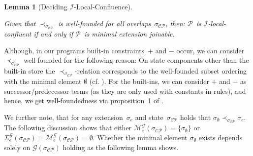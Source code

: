 \documentclass{tlp}
\newtheorem{lemma}[theorem]{Lemma}
\newcommand{\mcCP}{\ensuremath{\mathcal{CP}}}
\newcommand{\mcI}{\ensuremath{\mathcal{I}}}
\newcommand{\mcG}{\ensuremath{\mathcal{G}}}
\newcommand{\mcP}{\ensuremath{\mathcal{P}}}
\newcommand{\mcp}{\ensuremath{\mathcal{M}^\mcG_e(\sigma_{\mcCP})}}
\newcommand{\sigcp}{\ensuremath{\sigma_{\mcCP}}}
\begin{document}
\begin{lemma}[Deciding \mcI-Local-Confluence]\label{lem:obs_confl}

Given that $\prec_{\sigcp}$ is well-founded for all overlaps~$\sigcp$, then:
\mcP\ is \mcI-local-confluent if and only if \mcP\ is minimal extension joinable.
\end{lemma}

Although, in our programs built-in constraints~${+}$ and ${-}$ occur, we can
consider $\prec_{\sigcp}$ well-founded for the following reason: On state
components other than the built-in store the $\prec_{\sigcp}$-relation
corresponds to the well-founded subset ordering with the minimal element
$\emptyset$ (cf. \cite{duckstuckeysulzmann07}). For the built-ins, we can
consider ${+}$ and ${-}$ as successor/predecessor terms (as they are only used
with constants in rules), and hence, we get well-foundedness via proposition~1 of
\cite{duckstuckeysulzmann07}. 

We further note, that for any extension~$\sigma_e$ and state~$\sigcp$ holds that
$\sigma_\emptyset \prec_{\sigcp} \sigma_e$. The following discussion shows that
either $\mcp = \{\sigma_{\emptyset}\}$ or $\Sigma_e^{\mcG}(\sigcp) = \mcp =
\emptyset$. Whether the minimal element $\sigma_{\emptyset}$ exists depends
solely on $\mcG(\sigcp)$ holding as the following lemma shows.
\end{document}
